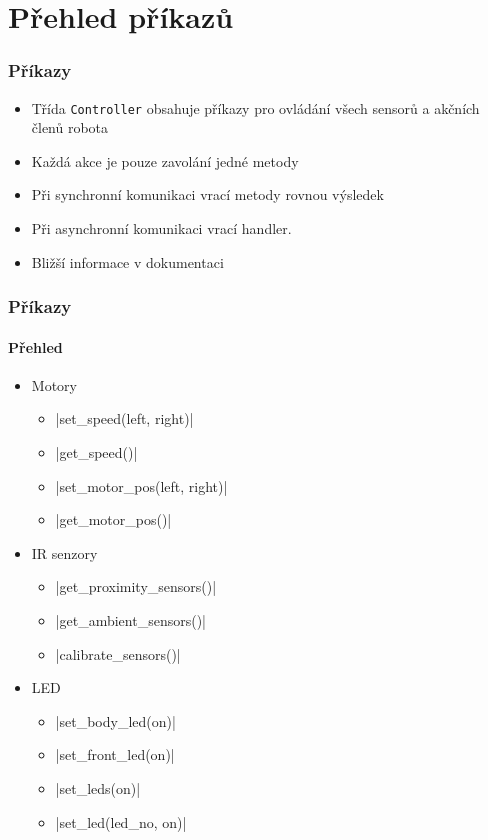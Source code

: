 \documentclass{beamer}
\begin{document}
\section{Přehled příkazů}

\begin{frame}
    \frametitle{Příkazy}
    \begin{itemize}
        \item Třída {\tt Controller} obsahuje  příkazy pro ovládání všech
        sensorů a akčních členů robota
        \item Každá akce je pouze zavolání jedné metody
        \item Při synchronní komunikaci vrací metody rovnou výsledek
        \item Při asynchronní komunikaci vrací handler.
        \item Bližší informace v dokumentaci
    \end{itemize}
\end{frame}

\begin{frame}
    \frametitle{Příkazy}
    \framesubtitle{Přehled}
    \begin{itemize}
        \item Motory
        \begin{itemize}
            \item {}|set_speed(left, right)|
            \item {}|get_speed()|
            \item {}|set_motor_pos(left, right)|
            \item {}|get_motor_pos()|
        \end{itemize}
        \item IR senzory
        \begin{itemize}
            \item {}|get_proximity_sensors()|
            \item {}|get_ambient_sensors()|
            \item {}|calibrate_sensors()|
        \end{itemize}
        \item LED
        \begin{itemize}
            \item {}|set_body_led(on)|
            \item {}|set_front_led(on)|
            \item {}|set_leds(on)|
            \item {}|set_led(led_no, on)|
        \end{itemize}
    \end{itemize}
\end{frame}
\end{document}
